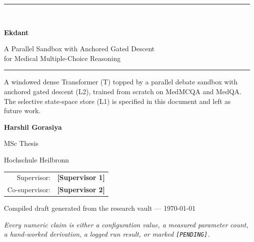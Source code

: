 \documentclass[11pt,a4paper]{article}
\theoremstyle{plain}
\theoremstyle{definition}
\theoremstyle{remark}
\begin{document}
\begin{titlepage}
\thispagestyle{empty}
\centering
\vspace*{3.2cm}

{\color{ekLone}\rule{\textwidth}{1.4pt}}\\[0.5cm]
{\Huge\bfseries Ekdant\par}
\vspace{0.7cm}
{\large A Parallel Sandbox with Anchored Gated Descent\\[0.25cm]
for Medical Multiple-Choice Reasoning\par}
\vspace{0.6cm}
{\color{ekLone}\rule{\textwidth}{1.4pt}}

\vspace{2.6cm}

\begin{minipage}{0.82\textwidth}
\centering\small
A windowed dense Transformer (T) topped by a parallel debate sandbox with
anchored gated descent (L2), trained from scratch on MedMCQA and MedQA. The
selective state-space store (L1) is specified in this document and left as
future work.
\end{minipage}

\vfill

{\Large\bfseries Harshil Gorasiya\par}
\vspace{0.7cm}

{\large MSc Thesis\par}
\vspace{0.25cm}
{\normalsize Hochschule Heilbronn\par}
\vspace{0.6cm}

\begin{minipage}{0.72\textwidth}
\centering\small
\begin{tabular}{@{}r@{\quad}l@{}}
Supervisor:      & \textbf{[Supervisor 1]} \\
Co-supervisor:   & \textbf{[Supervisor 2]} \\
\end{tabular}
\end{minipage}

\vspace{0.9cm}

{\small Compiled draft generated from the research vault --- \today\par}

\vspace{0.8cm}
{\small\itshape Every numeric claim is either a configuration value, a measured parameter
count, a hand-worked derivation, a logged run result, or marked
\texttt{[PENDING]}.\par}
\end{titlepage}
\end{document}

